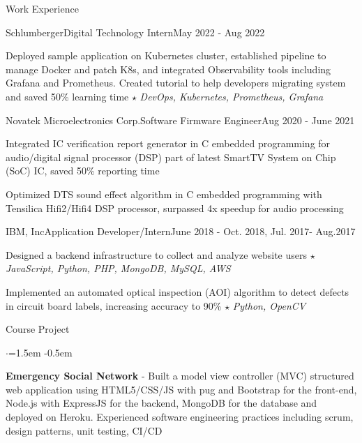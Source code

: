 \documentclass{resume_short} %
\begin{document}
\begin{rSection}{Work Experience}
    \begin{rSubsection3}{Schlumberger}{Digital Technology Intern}{May 2022 - Aug 2022}
        \item Deployed sample application on Kubernetes cluster, established pipeline to manage Docker and patch K8s, and integrated Observability tools including Grafana and Prometheus. Created tutorial to help developers migrating system and saved 50\% learning time $\star$ {\em DevOps, Kubernetes, Prometheus, Grafana}
    \end{rSubsection3}
    \begin{rSubsection3}{Novatek Microelectronics Corp.}{Software Firmware Engineer}{Aug 2020 - June 2021}
        \item Integrated IC verification report generator in C embedded programming for audio/digital signal processor (DSP) part of latest SmartTV System on Chip (SoC) IC, saved 50\% reporting time
        \item Optimized DTS sound effect algorithm in C embedded programming with Tensilica Hifi2/Hifi4 DSP processor, surpassed 4x speedup for audio processing
    \end{rSubsection3}
    \begin{rSubsection3}{IBM, Inc}{Application Developer/Intern}{June 2018 - Oct. 2018, Jul. 2017- Aug.2017}
        \item Designed a backend infrastructure to collect and analyze website users $\star$ {\em JavaScript, Python, PHP, MongoDB, MySQL, AWS}
        \item Implemented an automated optical inspection (AOI) algorithm to 
              detect defects in circuit board labels, increasing accuracy to 90\% $\star$ {\em Python, OpenCV}
    \end{rSubsection3}
\end{rSection}


\begin{rSection}{Course Project}
    \begin{list}{$\cdot$}{\leftmargin=1.5em}
        \itemsep -0.5em \vspace{-0.25em} %
        \item {\bf Emergency Social Network} - Built a model view controller (MVC) structured web application using HTML5/CSS/JS with pug and Bootstrap for the front-end, Node.js with ExpressJS for the backend, MongoDB for the database and deployed on Heroku. 
        Experienced software engineering practices including scrum, design patterns, unit testing, CI/CD
    \end{list}
\end{rSection}
\end{document}
